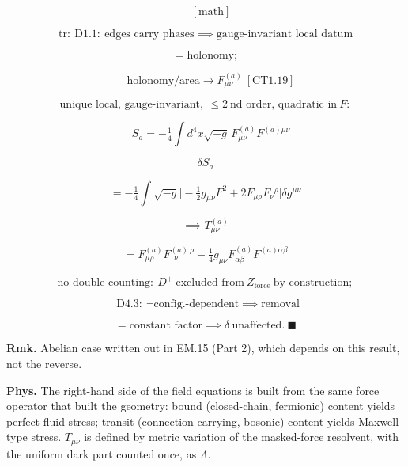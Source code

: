 \begin{theorem}
\[
\quad [\text{math}]
\]

\[
\text{tr}:\ \mathrm{D1.1}:\ \text{edges carry phases}\implies\text{gauge-invariant local datum}
\]

\[
= \text{holonomy};
\]

\[
\quad\text{holonomy/area}\to F^{(a)}_{\mu\nu}\ [\mathrm{CT1.19}]
\]

\[
\text{unique local, gauge-invariant},\ \le2\ \text{nd order, quadratic in}\ F:
\]

\[
\quad S_a=-\tfrac14\int d^4x\sqrt{-g}\,F^{(a)}_{\mu\nu}F^{(a)\mu\nu}
\]

\[
\delta S_a
\]

\[
= -\tfrac14\int\sqrt{-g}\bigl[-\tfrac12g_{\mu\nu}F^2+2F_{\mu\rho}F_\nu{}^\rho\bigr]\delta g^{\mu\nu}
\]

\[
\implies T^{(a)}_{\mu\nu}
\]

\[
= F^{(a)}_{\mu\rho}F^{(a)\ \rho}_{\ \ \nu}-\tfrac14g_{\mu\nu}F^{(a)}_{\alpha\beta}F^{(a)\alpha\beta}
\]

\[
\text{no double counting}:\ D^+\ \text{excluded from}\ Z_{\mathrm{force}}\ \text{by construction};
\]

\[
\ \ \mathrm{D4.3}:\ \neg\text{config.-dependent}\implies\text{removal}
\]

\[
= \text{constant factor}\implies\delta\ \text{unaffected}.\ \blacksquare
\]

\textbf{Rmk.} Abelian case written out in EM.15 (Part 2), which depends on this result, not the reverse.

\textbf{Phys.} The right-hand side of the field equations is built from the same force operator that built the geometry: bound (closed-chain, fermionic) content yields perfect-fluid stress; transit (connection-carrying, bosonic) content yields Maxwell-type stress. $T_{\mu\nu}$ is defined by metric variation of the masked-force resolvent, with the uniform dark part counted once, as $\Lambda$.

\end{theorem}

